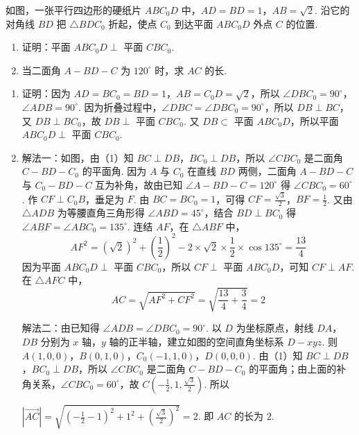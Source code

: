 \begin{problem}
如图，一张平行四边形的硬纸片 \(ABC_0D\) 中，\(AD=BD=1\)，\(AB=\sqrt{2}\). 沿它的对角线 \(BD\) 把 \(\triangle BDC_0\) 折起，使点 \(C_0\) 到达平面 \(ABC_0D\) 外点 \(C\) 的位置.

\begin{enumerate}
\item 证明：平面 \(ABC_0D \perp\) 平面 \(CBC_0\).

\item 当二面角 \(A-BD-C\) 为 \(120^\circ\) 时，求 \(AC\) 的长.
\end{enumerate}

\end{problem}

\begin{solution}
\begin{enumerate}
\item 证明：因为 \(AD=BC_0=BD=1\)，\(AB=C_0D=\sqrt{2}\)，所以 \(\angle DBC_0=90^\circ\)，\(\angle ADB=90^\circ\). 因为折叠过程中，\(\angle DBC=\angle DBC_0=90^\circ\)，所以 \(DB \perp BC\)，又 \(DB \perp BC_0\)，故 \(DB \perp\) 平面 \(CBC_0\). 又 \(DB \subset\) 平面 \(ABC_0D\)，所以平面 \(ABC_0D \perp\) 平面 \(CBC_0\).

\item 解法一：如图，由（1）知 \(BC \perp DB\)，\(BC_0 \perp DB\)，所以 \(\angle CBC_0\) 是二面角 \(C-BD-C_0\) 的平面角. 因为 \(A\) 与 \(C_0\) 在直线 \(BD\) 两侧，二面角 \(A-BD-C\) 与 \(C_0-BD-C\) 互为补角，故由已知 \(\angle A-BD-C=120^\circ\) 得 \(\angle CBC_0=60^\circ\). 作 \(CF \perp C_0B\)，垂足为 \(F\). 由 \(BC=BC_0=1\)，可得 \(CF=\frac{\sqrt{3}}{2}\)，\(BF=\frac{1}{2}\). 又由 \(\triangle ADB\) 为等腰直角三角形得 \(\angle ABD=45^\circ\)，结合 \(BD \perp BC_0\) 得 \(\angle ABF=\angle ABC_0=135^\circ\). 连结 \(AF\)，在 \(\triangle ABF\) 中，
\[
AF^2=\left(\sqrt{2}\right)^2+\left(\frac{1}{2}\right)^2-2\times \sqrt{2}\times \frac{1}{2}\times \cos 135^\circ=\frac{13}{4}
\]
因为平面 \(ABC_0D \perp\) 平面 \(CBC_0\)，所以 \(CF \perp\) 平面 \(ABC_0D\)，可知 \(CF \perp AF\). 在 \(\triangle AFC\) 中，
\[
AC=\sqrt{AF^2+CF^2}=\sqrt{\frac{13}{4}+\frac{3}{4}}=2
\]

解法二：由已知得 \(\angle ADB=\angle DBC_0=90^\circ\). 以 \(D\) 为坐标原点，射线 \(DA\)，\(DB\) 分别为 \(x\) 轴，\(y\) 轴的正半轴，建立如图的空间直角坐标系 \(D-xyz\). 则 \(A(1,0,0)\)，\(B(0,1,0)\)，\(C_0(-1,1,0)\)，\(D(0,0,0)\). 由（1）知 \(BC \perp DB\)，\(BC_0 \perp DB\)，所以 \(\angle CBC_0\) 是二面角 \(C-BD-C_0\) 的平面角；由上面的补角关系，\(\angle CBC_0=60^\circ\)，故 \(C\left(-\frac{1}{2},1,\frac{\sqrt{3}}{2}\right)\). 所以

\(\left| \overrightarrow{AC} \right|=\sqrt{\left(-\frac{1}{2}-1\right)^2+1^2+\left(\frac{\sqrt{3}}{2}\right)^2}=2\).
即 \(AC\) 的长为 \(2\).
\end{enumerate}
\end{solution}

